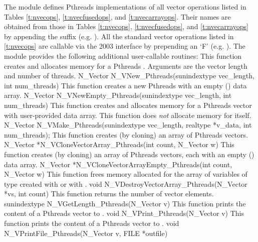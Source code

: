 The {\nvecpthreads} module defines Pthreads implementations of all vector operations listed 
in Tables \ref{t:nvecops}, \ref{t:nvecfusedops}, and \ref{t:nvecarrayops}. Their names are
obtained from those in Tables \ref{t:nvecops}, \ref{t:nvecfusedops}, and
\ref{t:nvecarrayops} by appending the suffix 
(e.g. ).
All the standard vector operations listed in \ref{t:nvecops} are callable via
the {\F} 2003 interface by prepending an `F' (e.g. ).
The module {\nvecpthreads} provides the following additional user-callable routines:
{
  This function creates and allocates memory for a Pthreads .
  Arguments are the vector length and number of threads.
}
{
  N\_Vector N\_VNew\_Pthreads(sunindextype vec\_length, int num\_threads)
}
{
  This function creates a new Pthreads  with an empty () data array.
}
{
  N\_Vector N\_VNewEmpty\_Pthreads(sunindextype vec\_length, int num\_threads)
}
{
  This function creates and allocates memory for a Pthreads vector
  with user-provided data array. This function does {\em not} allocate memory
  for  itself.
}
{
  N\_Vector N\_VMake\_Pthreads(sunindextype vec\_length, realtype *v\_data,
  int num\_threads);
}
{
  This function creates (by cloning) an array of  Pthreads vectors.
}
{
  N\_Vector *N\_VCloneVectorArray\_Pthreads(int count, N\_Vector w)
}
{
  This function creates (by cloning) an array of  Pthreads vectors, each with an
  empty () data array.
}
{
  N\_Vector *N\_VCloneVectorArrayEmpty\_Pthreads(int count, N\_Vector w)
}
{
  This function frees memory allocated for the array of  variables of type
   created with  or with \newline
  .
}
{
  void N\_VDestroyVectorArray\_Pthreads(N\_Vector *vs, int count)
}
{
  This function returns the number of vector elements.
}
{ 
  sunindextype N\_VGetLength\_Pthreads(N\_Vector v)
}
{
  This function prints the content of a Pthreads vector to .
}
{
  void N\_VPrint\_Pthreads(N\_Vector v)
}
{
  This function prints the content of a Pthreads vector to .
}
{
  void N\_VPrintFile\_Pthreads(N\_Vector v, FILE *outfile)
}

